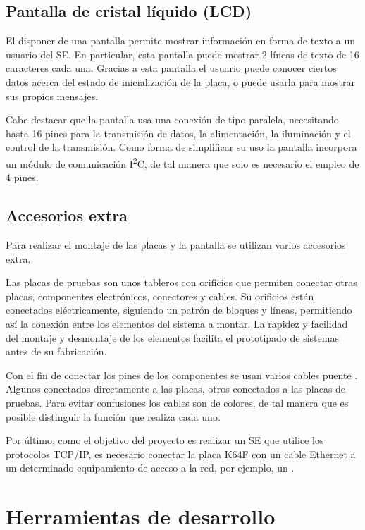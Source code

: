 \subsection{Pantalla de cristal líquido (LCD)}{\label{sec:lcd}}
El disponer de una pantalla permite mostrar información en forma de texto a un
usuario del SE. En particular, esta pantalla puede mostrar 2 líneas de texto
de 16 caracteres cada una. Gracias a esta pantalla el usuario puede
conocer ciertos datos acerca del estado de inicialización de la placa, o puede
usarla para mostrar sus propios mensajes.

Cabe destacar que la pantalla usa una conexión de tipo paralela, necesitando
hasta 16 pines para la transmisión de datos, la alimentación, la iluminación y
el control de la transmisión. Como forma de simplificar su uso la pantalla
incorpora un módulo de comunicación I\textsuperscript{2}C, de tal manera que
solo es necesario el empleo de 4 pines.

\subsection{Accesorios extra}{\label{sec:extras}}
Para realizar el montaje de las placas y la pantalla se utilizan varios
accesorios extra.

Las placas de pruebas \cite{webpage:placa-pruebas} son unos tableros con
orificios que permiten conectar otras placas, componentes electrónicos,
conectores y cables. Su orificios están conectados eléctricamente, siguiendo un
patrón de bloques y líneas, permitiendo así la conexión entre los elementos del
sistema a montar. La rapidez y facilidad del montaje y desmontaje de los
elementos facilita el prototipado de sistemas antes de su fabricación.

Con el fin de conectar los pines de los componentes se usan varios cables
puente \cite{webpage:cable-puente}. Algunos conectados directamente a las
placas, otros conectados a las placas de pruebas. Para evitar confusiones los
cables son de colores, de tal manera que es posible distinguir la función que
realiza cada uno.

Por último, como el objetivo del proyecto es realizar un SE que utilice los
protocolos TCP/IP, es necesario conectar la placa K64F con un cable Ethernet
a un determinado equipamiento de acceso a la red, por ejemplo,
un .

\section{Herramientas  de desarrollo}
  {\label{sec:herramientas}}

